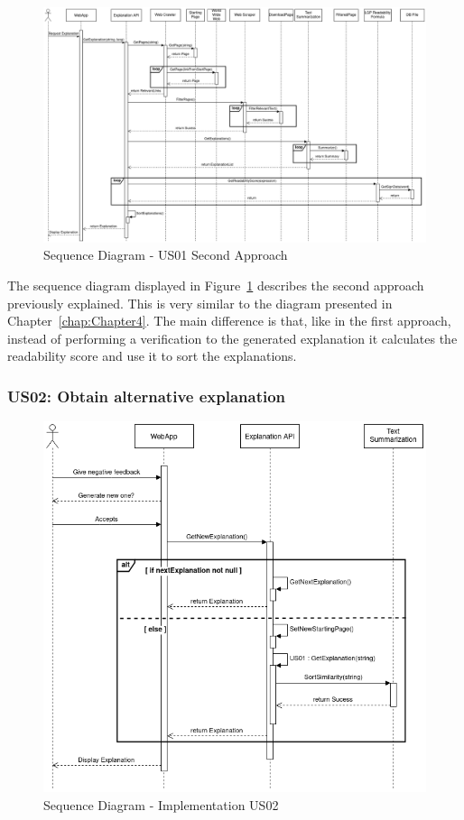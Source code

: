 \begin{figure}[H]
\centering
\includegraphics[width=\textwidth,keepaspectratio]{ch5/assets/US01_SD_Implement_Ap2.png}
\caption[Sequence Diagram US01 Second Approach]{Sequence Diagram - US01 Second Approach}
\label{fig:uc01Imp2}
\end{figure}

The sequence diagram displayed in Figure~\ref{fig:uc01Imp2} describes the second approach previously explained.
This is very similar to the diagram presented in Chapter~\ref{chap:Chapter4}.
The main difference is that, like in the first approach, instead of performing a verification to the generated explanation it calculates the readability score and use it to sort the explanations.

\subsubsection{US02: Obtain alternative explanation}

\begin{figure}[H]
\centering
\includegraphics[scale=0.45]{ch5/assets/US02_SD_Implement.png}
\caption[Sequence Diagram Implementation US02]{Sequence Diagram - Implementation US02}
\label{fig:uc02Imp}
\end{figure}


